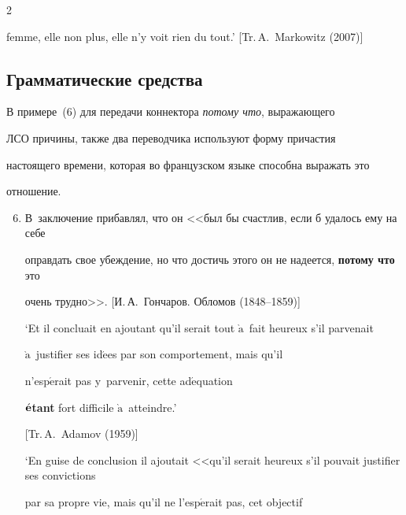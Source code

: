 \begin{multicols}{2}
{\begin{enumerate}[(1)]
femme, elle non plus, elle n'y voit rien du tout.' [Tr.\,A.~Markowitz (2007)]


\end{enumerate}


}





\subsection{Грамматические средства}





В примере~(6) для передачи коннектора \textit{потому что}, выражающего 


ЛСО причины, также два переводчика используют форму причастия 


настоящего времени, которая во французском языке способна выражать это 


отношение.


{\small


\begin{enumerate}[(1)]


\setcounter{enumi}{5}


\item В~заключение прибавлял, что он <<был бы счастлив, если б удалось ему на себе 


оправдать свое убеждение, но что достичь этого он не надеется, \textbf{потому что} это 


очень трудно>>. [И.\,А.~Гончаров. Обломов (1848--1859)]





`Et il concluait en ajoutant qu'il serait tout $\grave{\mbox{a}}$~fait heureux s'il parvenait 


$\grave{\mbox{a}}$~justifier ses id$\acute{\mbox{e}}$es par son comportement, mais qu'il 


n'esp$\acute{\mbox{e}}$rait pas y~parvenir, cette ad$\acute{\mbox{e}}$quation 


$\acute{\mbox{\textbf{e}}}$\textbf{tant} fort difficile $\grave{\mbox{a}}$~atteindre.' 


[Tr.\,A.~Adamov (1959)]





`En guise de conclusion il ajoutait <<qu'il serait heureux s'il pouvait justifier ses convictions 


par sa propre vie, mais qu'il ne l'esp$\acute{\mbox{e}}$rait pas, cet objectif 



\end{enumerate}}
\end{multicols}
